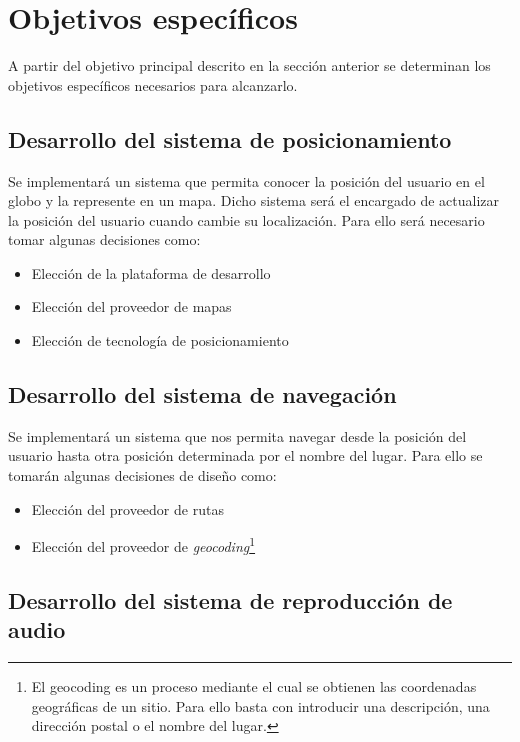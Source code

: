 \section{Objetivos específicos}

A partir del objetivo principal descrito en la sección anterior se determinan los objetivos
específicos necesarios para alcanzarlo.

\subsection{Desarrollo del sistema de posicionamiento}

Se implementará un sistema que permita conocer la posición del usuario en el globo y
la represente en un mapa. Dicho sistema será el encargado de actualizar la posición del usuario
cuando cambie su localización. Para ello será necesario tomar algunas decisiones como:

\begin{itemize}
  \item Elección de la plataforma de desarrollo
  \item Elección del proveedor de mapas
  \item Elección de tecnología de posicionamiento
\end{itemize}

\subsection{Desarrollo del sistema de navegación}

Se implementará un sistema que nos permita navegar desde la posición del usuario hasta otra posición
determinada por el nombre del lugar. Para ello se tomarán algunas decisiones de diseño como:

\begin{itemize}
  \item Elección del proveedor de rutas
  \item Elección del proveedor de \emph{geocoding}\footnote{El geocoding es un proceso mediante el
    cual se obtienen las coordenadas geográficas de un sitio. Para ello basta con introducir una
    descripción, una dirección postal o el nombre del lugar.}
\end{itemize}

\subsection{Desarrollo del sistema de reproducción de audio}

